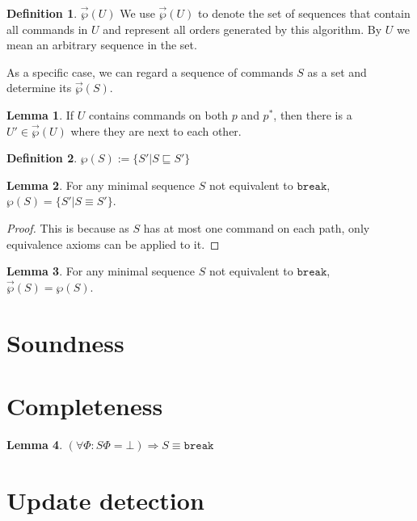 \documentclass[12pt]{article}
\newcommand{\empt}{\bot}
\newcommand{\FS}{\Phi} %
\newcommand{\pp}{p^*} %
\newcommand{\cbrk}{\mathtt{break}}
\newcommand{\eqext}{\sqsubseteq}
\newcommand{\extset}[1]{\wp({#1})}
\newcommand{\orderset}[1]{\vec{\wp}({#1})}
\newcommand{\ordered}[1]{#1}
\theoremstyle{definition}
\newtheorem{mydef}{Definition}
\newtheorem{mylem}{Lemma}
\begin{document}
\begin{mydef}{$\orderset{U}$}
We use $\orderset{U}$ to denote the set of sequences that contain all commands in $U$
and represent all orders generated by this algorithm.
By $\ordered{U}$ we mean an arbitrary sequence in the set.
\end{mydef}

As a specific case, we can regard a sequence of commands $S$
as a set and determine its $\orderset{S}$.

\begin{mylem}\label{lemma:neighbour}
If $U$ contains commands on both $p$ and $\pp$, then
there is a $U'\in\orderset{U}$ where they are next to each other.
\end{mylem}

\begin{mydef}
$\extset{S} := \{S'|S\eqext S'\}$
\end{mydef}

\begin{mylem}\label{lemma:minextset}
For any minimal sequence $S$ not equivalent to $\cbrk$, $\extset{S} = \{S'|S\equiv S'\}$.
\end{mylem}
\begin{proof}
This is because as $S$ has at most one command on each path, only equivalence axioms
can be applied to it.
\end{proof}

\begin{mylem}\label{lemma:minextorder}
For any minimal sequence $S$ not equivalent to $\cbrk$,
$\orderset{S} = \extset{S}$.
\end{mylem}


\section{Soundness}

\section{Completeness}

\begin{mylem}
\((\forall\FS: S\FS = \empt) \Rightarrow S \equiv \cbrk\)
\end{mylem}

\section{Update detection}
\end{document}
